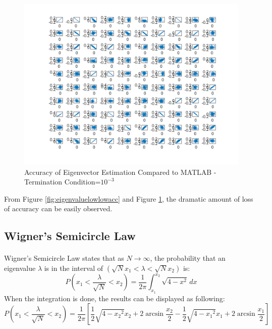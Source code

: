 \documentclass[letterpaper,12pt]{article}
\begin{document}
      \begin{figure}[H] 
         \centering \includegraphics[width=\columnwidth]{figures/eigenvectorlowlowacc.png}           
                        \caption{Accuracy of Eigenvector Estimation Compared to MATLAB - Termination Condition=$10^{-3}$}                
                           \label{fig:eigenvectorlowlowacc}
         \end{figure}

   From Figure \ref{fig:eigenvaluelowlowacc} and Figure \ref{fig:eigenvectorlowlowacc}, the dramatic amount of loss of accuracy can be easily observed.
\subsection{Wigner's Semicircle Law}
\paragraph{} Wigner's Semicircle Law states that as $N \rightarrow \infty$, the probability that an eigenvalue $\lambda$ is
in the interval of $(\sqrt{N}x_1 < \lambda < \sqrt{N}x_2)$ is:
\begin{equation*}
   P(x_1 < \frac{\lambda}{\sqrt{N}} < x_2) = \frac{1}{2\pi}\int_{x_1}^{x_2} \sqrt{4-x^2}\,dx 
\end{equation*}
When the integration is done, the results can be displayed as following:
\begin{equation*}
   P(x_1 < \frac{\lambda}{\sqrt{N}} < x_2) = \frac{1}{2\pi} \left[ \frac{1}{2}\sqrt{4-{x_2}^2}x_2 + 2 \arcsin\frac{x_2}{2} - \frac{1}{2}\sqrt{4-{x_1}^2}x_1 + 2 \arcsin\frac{x_1}{2} \right]
\end{equation*}
\end{document}
